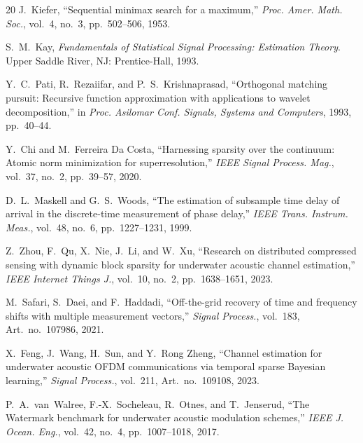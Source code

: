 \documentclass[journal]{IEEEtran}
\begin{document}
\begin{thebibliography}{20}
J.~Kiefer, ``Sequential minimax search for a maximum,'' \textit{Proc. Amer. Math. Soc.}, vol.~4, no.~3, pp.~502--506, 1953.

S.~M.~Kay, \textit{Fundamentals of Statistical Signal Processing: Estimation Theory}. Upper Saddle River, NJ: Prentice-Hall, 1993.

Y.~C.~Pati, R.~Rezaiifar, and P.~S.~Krishnaprasad, ``Orthogonal matching pursuit: Recursive function approximation with applications to wavelet decomposition,'' in \textit{Proc. Asilomar Conf. Signals, Systems and Computers}, 1993, pp.~40--44.

Y.~Chi and M.~{Ferreira Da Costa}, ``Harnessing sparsity over the continuum: Atomic norm minimization for superresolution,'' \textit{IEEE Signal Process. Mag.}, vol.~37, no.~2, pp.~39--57, 2020.

D.~L.~Maskell and G.~S.~Woods, ``The estimation of subsample time delay of arrival in the discrete-time measurement of phase delay,'' \textit{IEEE Trans. Instrum. Meas.}, vol.~48, no.~6, pp.~1227--1231, 1999.

Z.~Zhou, F.~Qu, X.~Nie, J.~Li, and W.~Xu, ``Research on distributed compressed sensing with dynamic block sparsity for underwater acoustic channel estimation,'' \textit{IEEE Internet Things J.}, vol.~10, no.~2, pp.~1638--1651, 2023.

M.~Safari, S.~Daei, and F.~Haddadi, ``Off-the-grid recovery of time and frequency shifts with multiple measurement vectors,'' \textit{Signal Process.}, vol.~183, Art.~no.~107986, 2021.

X.~Feng, J.~Wang, H.~Sun, and Y.~{Rong Zheng}, ``Channel estimation for underwater acoustic OFDM communications via temporal sparse Bayesian learning,'' \textit{Signal Process.}, vol.~211, Art.~no.~109108, 2023.

P.~A.~van~Walree, F.-X.~Socheleau, R.~Otnes, and T.~Jenserud, ``The Watermark benchmark for underwater acoustic modulation schemes,'' \textit{IEEE J. Ocean. Eng.}, vol.~42, no.~4, pp.~1007--1018, 2017.

\end{thebibliography}
\end{document}
